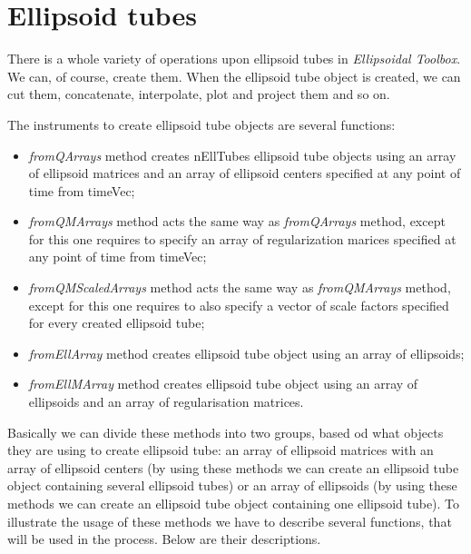 \documentclass[letterpaper,10pt,english]{sphinxmanual}
\begin{document}
\section{Ellipsoid tubes}
\label{chap_ellTube:ellipsoid-tubes}
There is a whole variety of operations upon ellipsoid tubes in \emph{Ellipsoidal Toolbox}. We can, of course, create them. When the ellipsoid tube object is created, we can cut them, concatenate, interpolate, plot and project them and so on.

The instruments to create ellipsoid tube objects are several functions:
\begin{itemize}
\item {} 
\emph{fromQArrays} method creates nEllTubes ellipsoid tube objects using an array of ellipsoid matrices and an array of ellipsoid centers specified at any point of time from timeVec;

\item {} 
\emph{fromQMArrays} method acts the same way as \emph{fromQArrays} method, except for this one requires to specify an array of regularization marices specified at any point of time from timeVec;

\item {} 
\emph{fromQMScaledArrays} method acts the same way as \emph{fromQMArrays} method, except for this one requires to also specify a vector of scale factors specified for every created ellipsoid tube;

\item {} 
\emph{fromEllArray} method creates ellipsoid tube object using an array of ellipsoids;

\item {} 
\emph{fromEllMArray} method creates ellipsoid tube object using an array of ellipsoids and an array of regularisation matrices.

\end{itemize}

Basically we can divide these methods into two groups, based od what objects they are using to create ellipsoid tube: an array of ellipsoid matrices with an array of ellipsoid centers (by using these methods we can create an ellipsoid tube object containing several ellipsoid tubes) or an array of ellipsoids (by using these methods we can create an ellipsoid tube object containing one ellipsoid tube). To illustrate the usage of these methods we have to describe several functions, that will be used in the process. Below are their descriptions.
\end{document}
